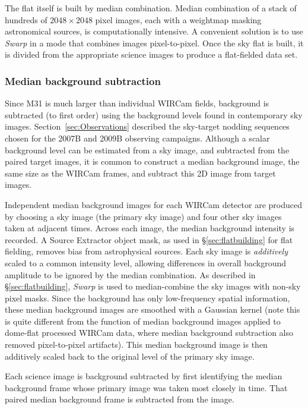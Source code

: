 \documentclass[iop]{emulateapj}
\newcommand{\sw}[1]{\textit{#1}} %
\newcommand{\Sec}[1]{\S\ref{sec:#1}}  %
\begin{document}
The flat itself is built by median combination.
Median combination of a stack of hundreds of $2048\times2048$ pixel images, each with a weightmap masking astronomical sources, is computationally intensive.
A convenient solution is to use \sw{Swarp} \citep[an image-mosaicing software package,][]{Bertin:2002} in a mode that combines images pixel-to-pixel.
Once the sky flat is built, it is divided from the appropriate science images to produce a flat-fielded data set.

\subsubsection{Median background subtraction}
\label{sec:mediansky}

Since M31 is much larger than individual WIRCam fields, background is subtracted (to first order) using the background levels found in contemporary sky images.
Section~\ref{sec:Observations} described the sky-target nodding sequences chosen for the 2007B and 2009B observing campaigns. 
Although a scalar background level can be estimated from a sky image, and subtracted from the paired target images, it is common to construct a median background image, the same size as the WIRCam frames, and subtract this 2D image from target images.

Independent median background images for each WIRCam detector are produced by choosing a sky image (the primary sky image) and four other sky images taken at adjacent times.
Across each image, the median background intensity is recorded.
A Source Extractor object mask, as used in \Sec{flatbuilding} for flat fielding, removes bias from astrophysical sources.
Each sky image is \emph{additively} scaled to a common intensity level, allowing differences in overall background amplitude to be ignored by the median combination.
As described in \Sec{flatbuilding}, \sw{Swarp} is used to median-combine the sky images with non-sky pixel masks.
Since the background has only low-frequency spatial information, these median background images are smoothed with a Gaussian kernel (note this is quite different from the function of median background images applied to dome-flat processed WIRCam data, where median background subtraction also removed pixel-to-pixel artifacts).
This median background image is then additively scaled back to the original level of the primary sky image.

Each science image is background subtracted by first identifying the median background frame whose primary image was taken most closely in time.
That paired median background frame is subtracted from the image.
\end{document}
